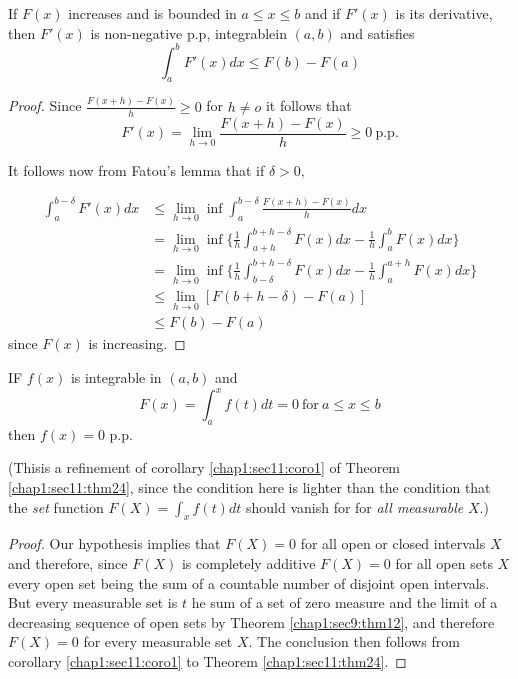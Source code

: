 \begin{theorem}\label{chap1:sec18:thm51}
  If $F(x)$ increases and is bounded in $a \le x \le b$ and if $F'(x)$ is
  its derivative, then $F'(x)$ is non-negative p.p,
  integrable\pageoriginale in $(a, b)$  and satisfies 
  $$
  \int^b_a F'(x) dx \le F(b) - F(a)
  $$
\end{theorem}

\begin{proof}
Since $\frac{F (x + h) - F(x)}{h} \ge 0$ for $ h \neq o$ it follows that
$$
F'(x)=\lim\limits_{h \to 0} \frac{F(x + h) - F(x)}{h} \ge 0 ~\text{p.p.}
$$

It follows now from Fatou's lemma that if $\delta > 0,$

\begin{align*}
  \int^{b-\delta}_a F'(x) dx & \le   \lim\limits_{h \to 0}\inf
  \int^{b-\delta}_a \frac{F(x + h) -F(x)}{h} dx\\ 
  & = \lim\limits_{h \to 0}\inf\bigg\{\frac{1}{h}\int^{b+h-\delta}_{a+h}
  F(x) dx - \frac{1}{h} \int ^b_a F (x) dx \bigg\} \\ 
  & = \lim\limits_{h \to
    0}\inf\bigg\{\frac{1}{h}\int^{b+h-\delta}_{b-\delta} F(x) dx
  -\frac{1}{h} \int^{a+ h}_a F(x)dx \bigg\}\\ 
  & \le \lim\limits_{h \to 0}[F (b+ h -\delta)- F(a)]\\
  & \le F(b)-F(a)
\end{align*}
since $F(x)$ is increasing.
\end{proof}

\begin{theorem}\label{chap1:sec18:thm52}
  IF $f(x)$ is integrable in $(a, b)$ and 
  $$
F(x)= \int^x_a f (t) dt = 0 ~\text{for}~ a \le x \le b
$$
then $f(x)=0$ p.p.
\end{theorem}
 
(This\pageoriginale is a refinement of corollary
\ref{chap1:sec11:coro1} of Theorem \ref{chap1:sec11:thm24}, since the 
condition here is lighter than the condition that the \textit{set} function
$F(X)=\int_x f(t)dt$ should vanish for for \textit{all measurable} $X$.) 

\begin{proof}
  Our hypothesis implies that $F(X)=0$ for all open or closed intervals
  $X$ and therefore, since $F(X)$ is completely additive $F(X)=0$ for all open
  sets $X$ every open set being the sum of a countable number of disjoint
  open  intervals. But every measurable set is $t$ he sum of a set of zero
  measure and the limit of a decreasing sequence of open sets by Theorem
  \ref{chap1:sec9:thm12}, and therefore $F(X) =0$ for every measurable
  set $X$. The conclusion 
  then follows from corollary \ref{chap1:sec11:coro1} to Theorem
  \ref{chap1:sec11:thm24}.  
\end{proof}

